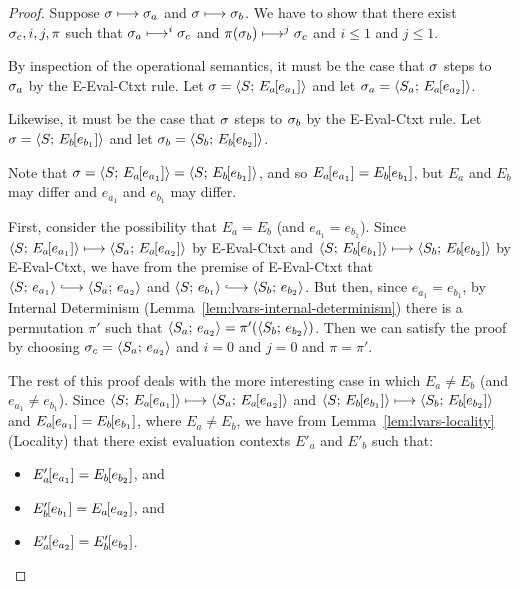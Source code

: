 \begin{proof}
  Suppose $\sigma \longmapsto \sigma_a$ and $\sigma \longmapsto \sigma_b$.
  We have to show that there exist $\sigma_c, i, j, \pi$ such that
  $\sigma_a \longmapsto^i \sigma_c$ and $\pi(\sigma_b) \longmapsto^j
  \sigma_c$ and $i \leq 1$ and $j \leq 1$.

  By inspection of the operational semantics, it must be the case that
  $\sigma$ steps to $\sigma_a$ by the {\sc E-Eval-Ctxt} rule.  Let
  $\sigma = \langle S;\, E_a\hspace{-1mm}\left[e_{a_1}\right] \rangle$ and let $\sigma_a =
  \langle S_a;\, E_a\hspace{-1mm}\left[e_{a_2}\right] \rangle$.

  Likewise, it must be the case that $\sigma$ steps to $\sigma_b$ by the
  {\sc E-Eval-Ctxt} rule.  Let $\sigma =
  \langle S;\, E_b\hspace{-1mm}\left[e_{b_1}\right] \rangle$ and let $\sigma_b =
  \langle S_b;\, E_b\hspace{-1mm}\left[e_{b_2}\right] \rangle$.

  Note that $\sigma = \langle S;\, E_a\hspace{-1mm}\left[e_{a_1}\right] \rangle =
  \langle S;\, E_b\hspace{-1mm}\left[e_{b_1}\right] \rangle$, and so
  $E_a\hspace{-1mm}\left[e_{a_1}\right] = E_b\hspace{-1mm}\left[e_{b_1}\right]$, but $E_a$ and
  $E_b$ may differ and $e_{a_1}$ and $e_{b_1}$ may differ.

  First, consider the possibility that $E_a = E_b$ (and $e_{a_1} =
  e_{b_1}$).  Since $\langle S;\, E_a\hspace{-1mm}\left[e_{a_1}\right] \rangle \longmapsto
  \langle S_a;\, E_a\hspace{-1mm}\left[e_{a_2}\right] \rangle$ by {\sc E-Eval-Ctxt} and
  $\langle S;\, E_b\hspace{-1mm}\left[e_{b_1}\right] \rangle \longmapsto
  \langle S_b;\, E_b\hspace{-1mm}\left[e_{b_2}\right] \rangle$ by {\sc E-Eval-Ctxt}, we have
  from the premise of {\sc E-Eval-Ctxt} that $\config{S}{e_{a_1}}
  \parstepsto \config{S_a}{e_{a_2}}$ and $\config{S}{e_{b_1}}
  \parstepsto \config{S_b}{e_{b_2}}$.  But then, since $e_{a_1} =
  e_{b_1}$, by Internal Determinism
  (Lemma~\ref{lem:lvars-internal-determinism}) there is a permutation
  $\pi'$ such that $\langle S_a;\, e_{a_2} \rangle =
  \pi'(\langle S_b;\, e_{b_2} \rangle)$.  Then we can satisfy the proof by
  choosing $\sigma_c = \langle S_a;\, e_{a_2} \rangle$ and $i = 0$ and $j = 0$
  and $\pi = \pi'$.

  The rest of this proof deals with the more interesting case in which
  $E_a \neq E_b$ (and $e_{a_1} \neq e_{b_1}$).  Since
  $\langle S;\, E_a\hspace{-1mm}\left[e_{a_1}\right] \rangle \longmapsto
  \langle S_a;\, E_a\hspace{-1mm}\left[e_{a_2}\right] \rangle$ and
  $\langle S;\, E_b\hspace{-1mm}\left[e_{b_1}\right] \rangle \longmapsto
  \langle S_b;\, E_b\hspace{-1mm}\left[e_{b_2}\right] \rangle$ and $E_a\hspace{-1mm}\left[e_{a_1}\right]
  = E_b\hspace{-1mm}\left[e_{b_1}\right]$, where $E_a \neq E_b$, we have from
  Lemma~\ref{lem:lvars-locality} (Locality) that there exist
  evaluation contexts $E'_a$ and $E'_b$ such that:

  \begin{itemize}
  \item $E'_a\hspace{-1mm}\left[e_{a_1}\right] = E_b\hspace{-1mm}\left[e_{b_2}\right]$, and
  \item $E'_b\hspace{-1mm}\left[e_{b_1}\right] = E_a\hspace{-1mm}\left[e_{a_2}\right]$, and
  \item $E'_a\hspace{-1mm}\left[e_{a_2}\right] =
  E'_b\hspace{-1mm}\left[e_{b_2}\right]$.
  \end{itemize}


\end{proof}
